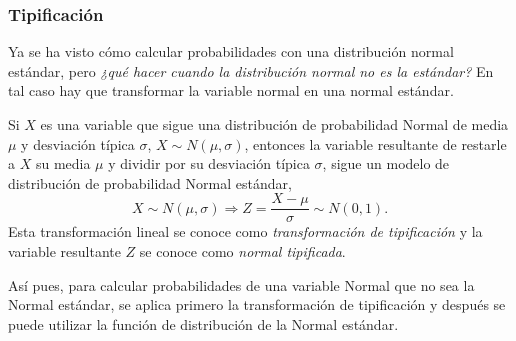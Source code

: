 \begin{frame}
\frametitle{Tipificación}
Ya se ha visto cómo calcular probabilidades con una distribución normal estándar, pero \emph{¿qué hacer cuando la distribución normal no es la estándar?}
En tal caso hay que transformar la variable normal en una normal estándar.

\begin{teorema}[Tipificación]
Si $X$ es una variable que sigue una distribución de probabilidad Normal de media $\mu$ y desviación típica $\sigma$, $X\sim N(\mu,\sigma)$, entonces la variable resultante de restarle a $X$ su media $\mu$ y dividir por su desviación típica $\sigma$, sigue un modelo de distribución de probabilidad Normal estándar,
\[
X\sim N(\mu,\sigma) \Rightarrow Z=\frac{X-\mu}{\sigma}\sim N(0,1).
\]
Esta transformación lineal se conoce como \emph{transformación de tipificación} y la variable resultante $Z$ se conoce como \emph{normal
tipificada}.
\end{teorema} 

Así pues, para calcular probabilidades de una variable Normal que no sea la Normal estándar, se aplica primero la transformación de tipificación y después se puede utilizar la función de distribución de la Normal estándar.

\end{frame}


